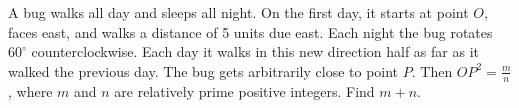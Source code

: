A bug walks all day and sleeps all night. On the first day, it starts at point $O$, faces east, and walks a distance of 5 units due east. Each night the bug rotates $60 ^\circ$ counterclockwise. Each day it walks in this new direction half as far as it walked the previous day. The bug gets arbitrarily close to point $P$. Then $OP^2 = \frac{m}{n}$, where $m$ and $n$ are relatively prime positive integers. Find $m + n$.